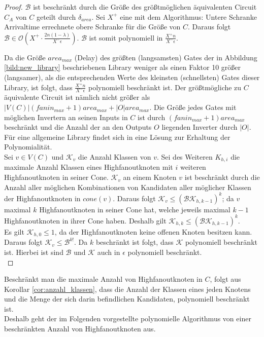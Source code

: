 \documentclass[11pt, a4paper, german]{article}
\begin{document}
\begin{proof}
$\mathcal{B}$ ist beschränkt durch die Größe des größtmöglichen äquivalenten Circuit $C_A$ von $C$ geteilt durch $\delta_{area}$. Sei $X^+$ eine mit dem Algorithmus: Untere Schranke Arrivaltime errechnete obere Schranke für die Größe von $C$. Daraus folgt $\mathcal{B} \in \mathcal{O}(X^+ \cdot \frac{2n(1-\lambda)}{X^- \epsilon})$. $\mathcal{B} $ ist somit polynomiell in $\frac{X^+ n}{X^- \epsilon}$. 



Da die Größe $area_{max}$ (Delay) des größten (langsamsten) Gates der in Abbildung \ref{bild:new_library} beschriebenen Library weniger als einen Faktor 10 größer (langsamer), als die entsprechenden Werte des kleinsten (schnellsten) Gates dieser Library, ist folgt, dass $\frac{X^+ n}{X^- \epsilon}$ polynomiell beschränkt ist.  Der größtmögliche zu $C$ äquivalente Circuit ist nämlich nicht größer als $|V(C)|(fanin_{max}+1)area_{max} + |O|area_{max}$. Die Größe jedes Gates mit möglichen Invertern an seinen Inputs in $C$ ist durch $(fanin_{max}+1)area_{max}$ beschränkt und die Anzahl der an den Outputs $O$ liegenden Inverter durch $|O|$.\\
Für eine allgemeine Library findet sich in \cite{Elbert} eine Lösung zur Erhaltung der Polynomialität.\\
Sei $v \in V(C)$ und $\mathcal{K}_v$ die Anzahl Klassen von $v$. Sei des Weiteren $K_{h,i}$ die maximale Anzahl Klassen eines Highfanoutknoten mit $i$ weiteren Highfanoutknoten in seiner Cone. 
$\mathcal{K}_v$ an einem Knoten $v$ ist beschränkt durch die Anzahl aller möglichen Kombinationen von Kandidaten aller möglicher Klassen der Highfanoutknoten in $cone(v)$. Daraus folgt $\mathcal{K}_v \leq (\mathcal{BK}_{h,k-1})^k$; da $v$ maximal $k$ Highfanoutknoten in seiner Cone hat, welche jeweils maximal $k-1$ Highfanoutknoten in ihrer Cone haben. Deshalb gilt $\mathcal{K}_{h,k} \leq (\mathcal{BK}_{h,k-1})^k$.\\
Es gilt $\mathcal{K}_{h,0} \leq 1$, da der Highfanoutknoten keine offenen Knoten besitzen kann. \\
Daraus folgt $\mathcal{K}_v \leq \mathcal{B}^{k!}$. Da $k$ beschränkt ist folgt, dass $\mathcal{K}$ polynomiell beschränkt ist. Hierbei ist sind $\mathcal{B}$ und $\mathcal{K}$ auch in $\epsilon$ polynomiell beschränkt. \\
\end{proof}

Beschränkt man die maximale Anzahl von Highfanoutknoten in $C$, folgt aus Korollar \ref{cor:anzahl_klassen}, dass die Anzahl der Klassen eines jeden Knotens und die Menge der sich darin befindlichen Kandidaten, polynomiell beschränkt ist. \\
Deshalb geht der im Folgenden vorgestellte polynomielle Algorithmus von einer beschränkten Anzahl von Highfanoutknoten aus.\\ 
\end{document}
